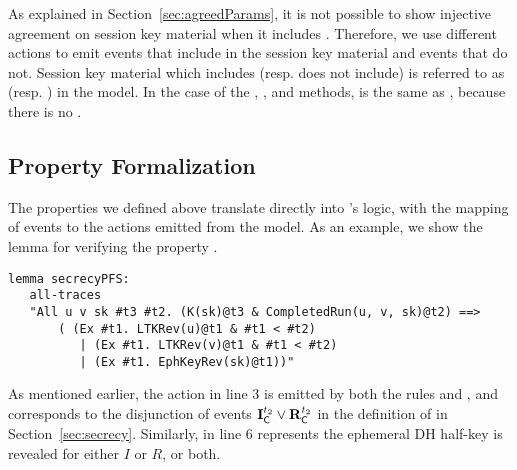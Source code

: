 As explained in Section~\ref{sec:agreedParams}, it is not possible to show
injective agreement on session key material when it includes \mGiy.
%
Therefore, we use different actions to emit events that include \mGiy{} in the
session key material and events that do not.
%
Session key material which includes (resp. does not include) \mGiy{} is referred to as  (resp. ) in the
\mTamarin{} model. %
%
In the case of the \mSigSig, \mSigStat{}, and \mPskPsk{} methods, 
is the same as , because there is no \mGiy.%
%



\subsection{Property Formalization}
\label{sec:propertyFormalization}
The properties we defined above translate directly into \mTamarin's logic,
with the mapping of events to the actions emitted from the model.
%
As an example, we show the lemma for verifying the property \mPredPfs.
%
\begin{lstlisting}
lemma secrecyPFS:
   all-traces
   "All u v sk #t3 #t2. (K(sk)@t3 & CompletedRun(u, v, sk)@t2) ==>
       ( (Ex #t1. LTKRev(u)@t1 & #t1 < #t2)
          | (Ex #t1. LTKRev(v)@t1 & #t1 < #t2)
          | (Ex #t1. EphKeyRev(sk)@t1))"
\end{lstlisting}
%
As mentioned earlier, the action  in line 3 is
emitted by both the rules  and , and corresponds
to the disjunction of events $\mathbf{I}_{\textsf{C}}^{t_2} \lor \mathbf{R}_{\textsf{C}}^{t_2}$ in the
definition of \mPredPfs{} in Section~\ref{sec:secrecy}.
%
Similarly,  in line 6 represents the ephemeral
DH half-key is revealed for either $I$ or $R$, or both.
%

